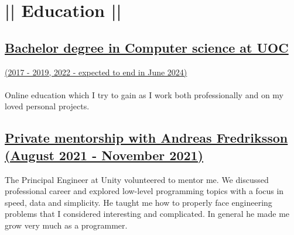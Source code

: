 \section*{|| Education ||}
\subsection*{\underline{Bachelor degree in Computer science at UOC}}
\underline{(2017 - 2019, 2022 - expected to end in June 2024)}\\\\
Online education which I try to gain as I work both professionally and on my loved personal projects.
\subsection*{\underline{Private mentorship with Andreas Fredriksson (August 2021 - November 2021)}}
The Principal Engineer at Unity volunteered to mentor me. We discussed professional career and explored low-level programming topics with a focus in speed, data and simplicity. He taught me how to properly face engineering problems that I considered interesting and complicated. In general he made me grow very much as a programmer.